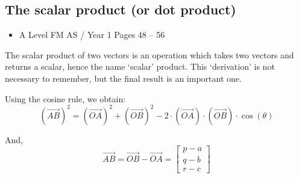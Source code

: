 \documentclass[11pt, a4paper]{article}
\begin{document}
\newpage
\subsection{The scalar product (or dot product)}
\begin{itemize}
\item A Level FM AS / Year 1 \hspace{1cm} Pages 48 -- 56
\end{itemize} \par
The scalar product of two vectors is an operation which takes two vectors and returns a scalar, hence the name `scalar' product. This `derivation' is not necessary to remember, but the final result is an important one.
\begin{figure}[H]
\centering
\begin{subfigure}[b]{0.85\textwidth}
\end{subfigure}
\end{figure}
Using the cosine rule, we obtain:
\begin{equation*}
\left( \overrightarrow{AB} \right)^{2}=\left( \overrightarrow{OA} \right)^{2}+\left( \overrightarrow{OB} \right)^{2}-2\cdot\left( \overrightarrow{OA} \right)\cdot\left( \overrightarrow{OB} \right)\cdot\cos(\theta)
\end{equation*}

And,
\begin{equation*}
\overrightarrow{AB}=\overrightarrow{OB}-\overrightarrow{OA}=\begin{bmatrix} p-a \\ q-b \\ r-c \end{bmatrix}
\end{equation*}
\end{document}
